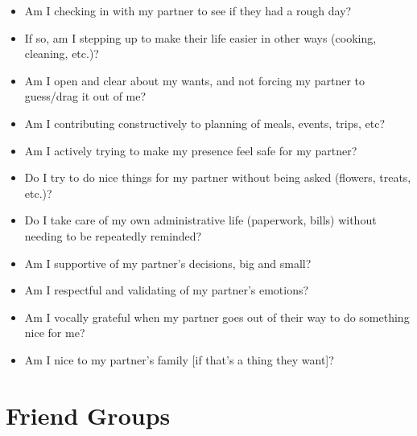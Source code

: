 \begin{itemize}
\item Am I checking in with my partner to see if they had a rough day?

\item If so, am I stepping up to make their life easier in other ways (cooking, cleaning, etc.)?

\item Am I open and clear about my wants, and not forcing my partner to guess\slash drag it out of me?

\item Am I contributing constructively to planning of meals, events, trips, etc?

\item Am I actively trying to make my presence feel safe for my partner?

\item Do I try to do nice things for my partner without being asked (flowers, treats, etc.)?

\item Do I take care of my own administrative life (paperwork, bills) without needing to be repeatedly reminded?

\item Am I supportive of my partner's decisions, big and small?

\item Am I respectful and validating of my partner's emotions?

\item Am I vocally grateful when my partner goes out of their way to do something nice for me?

\item Am I nice to my partner's family [if that's a thing they want]?

\end{itemize}

\part{Friend Groups}
\label{friendgroups}

